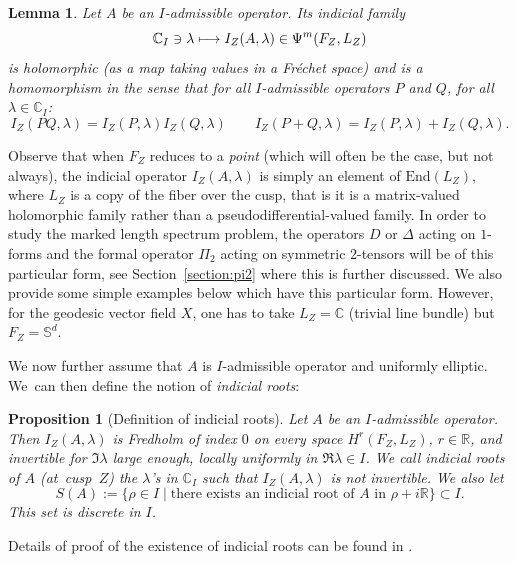\documentclass[10pt]{amsart}
\newcommand\mto{\mathchoice{\longmapsto}{\mapsto}{\mapsto}{\mapsto}}
\newcommand{\C}{\mathbb{C}}
\newcommand{\R}{\mathbb{R}}
\newcommand{\Ss}{\mathbb{S}}
\theoremstyle{plain}
\newtheorem{lemma}{Lemma}[section]
\newtheorem{proposition}{Proposition}[section]
\theoremstyle{definition}
\begin{document}
\begin{lemma}
\label{lemma:homomorphism}
Let $A$ be an $I$-admissible operator. Its indicial family
\[
\C_I \ni \lambda \mto I_Z(A,\lambda) \in \Psi^m(F_Z,L_Z)
\]
is holomorphic (as a map taking values in a Fréchet space) and is a homomorphism in the sense that for all $I$-admissible operators $P$ and $Q$, for all $\lambda \in \C_I$:
\[
I_Z(PQ,\lambda) = I_Z(P,\lambda) I_Z(Q,\lambda) \qquad I_Z(P+Q,\lambda) = I_Z(P,\lambda) + I_Z(Q,\lambda).
\]
\end{lemma}

Observe that when $F_Z$ reduces to a \emph{point} (which will often be the case, but not always), the indicial operator $I_Z(A,\lambda)$ is simply an element of $\mathrm{End}(L_Z)$, where $L_Z$ is a copy of the fiber over the cusp, that is it is a matrix-valued holomorphic family rather than a pseudodifferential-valued family. In order to study the marked length spectrum problem, the operators $D$ or $\Delta$ acting on $1$-forms and the formal operator $\Pi_2$ acting on symmetric $2$-tensors will be of this particular form, see Section~\ref{section:pi2} where this is further discussed. We also provide some simple examples below which have this particular form. However, for the geodesic vector field $X$, one has to take $L_Z = \C$ (trivial line bundle) but $F_Z = \Ss^d$.

We now further assume that $A$ is $I$-admissible operator and uniformly elliptic. We~can then define the notion of \emph{indicial roots}:

\begin{proposition}[Definition of indicial roots]
\label{prop:indicial-resolvent-elliptic}
Let $A$ be an $I$-admissible operator. Then $I_Z(A,\lambda)$ is Fredholm of index $0$ on every space $H^r(F_Z,L_Z)$, $r \in \R$, and invertible for $\Im\lambda$ large enough, locally uniformly in $\Re \lambda\in I$. We call \emph{indicial roots} of $A$ (at~cusp~$Z$) the $\lambda$'s in $\C_I$ such that $I_Z(A,\lambda)$ is not invertible. We also let
\begin{equation}\label{eq:def-S}
S(A):=\{ \rho \in I \mid \text{there exists an indicial root of $A$ in $\rho + i \R$}\} \subset I.
\end{equation}
This set is discrete in $I$.
\end{proposition}

Details of proof of the existence of indicial roots can be found in \cite[\S 4.2.2]{Bonthonneau-Lefeuvre-19-1}.
\end{document}
